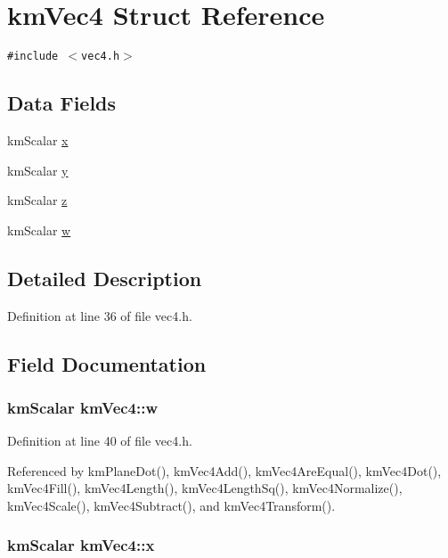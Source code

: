 \hypertarget{structkm_vec4}{
\section{kmVec4 Struct Reference}
\label{structkm_vec4}
}
{\tt \#include $<$vec4.h$>$}

\subsection*{Data Fields}
\begin{CompactItemize}
\item 
kmScalar \hyperlink{structkm_vec4_2f05daa4b1ff4cdb6f5340d0ff28c6ac}{x}
\item 
kmScalar \hyperlink{structkm_vec4_166ea934d56eca30a97b190d365b62b8}{y}
\item 
kmScalar \hyperlink{structkm_vec4_f4e022632723b68a304ac40d308cceab}{z}
\item 
kmScalar \hyperlink{structkm_vec4_b002db65c3793806ec266f2cc348879f}{w}
\end{CompactItemize}


\subsection{Detailed Description}


Definition at line 36 of file vec4.h.

\subsection{Field Documentation}
\hypertarget{structkm_vec4_b002db65c3793806ec266f2cc348879f}{
\subsubsection[{w}]{\setlength{\rightskip}{0pt plus 5cm}kmScalar {\bf kmVec4::w}}}
\label{structkm_vec4_b002db65c3793806ec266f2cc348879f}




Definition at line 40 of file vec4.h.

Referenced by kmPlaneDot(), kmVec4Add(), kmVec4AreEqual(), kmVec4Dot(), kmVec4Fill(), kmVec4Length(), kmVec4LengthSq(), kmVec4Normalize(), kmVec4Scale(), kmVec4Subtract(), and kmVec4Transform().\hypertarget{structkm_vec4_2f05daa4b1ff4cdb6f5340d0ff28c6ac}{
\subsubsection[{x}]{\setlength{\rightskip}{0pt plus 5cm}kmScalar {\bf kmVec4::x}}}
\label{structkm_vec4_2f05daa4b1ff4cdb6f5340d0ff28c6ac}




